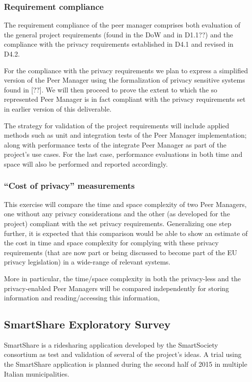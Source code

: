 \subsubsection{Requirement compliance}
The requirement compliance of the peer manager comprises both evaluation of the general project requirements (found in the DoW and in D1.1??) and the compliance with the privacy requirements established in D4.1 and revised in D4.2.

For the compliance with the privacy requirements we plan to express a simplified version of the Peer Manager using the formalization of privacy sensitive systems found in [??]. We will then proceed to prove the extent to which the so represented Peer Manager is in fact compliant with the privacy requirements set in earlier version of this deliverable. 

The strategy for validation of the project requirements will include applied methods such as unit and integration tests of the Peer Manager implementation; along with performance tests of the integrate Peer Manager as part of the project's use cases. For the last case, performance evaluations in both time and space will also be performed and reported accordingly.  

\subsubsection{``Cost of privacy'' measurements}
This exercise will compare the time and space complexity of two Peer Managers, one without any privacy considerations and the other (as developed for the project) compliant with the set privacy requirements. Generalizing one step further, it is expected that this comparison would be able to show an estimate of the cost in time and space complexity for complying with these privacy requirements (that are now part or being discussed to become part of the EU privacy legislation) in a wide-range of relevant systems.

More in particular, the time/space complexity in both the privacy-less and the privacy-enabled Peer Managers will be compared independently for storing information and reading/accessing this information, 

\subsection{SmartShare Exploratory Survey}
SmartShare is a ridesharing application developed by the SmartSociety consortium as test and validation of several of the project's ideas.  A trial using the SmartShare application is planned during the second half of 2015 in multiple Italian municipalities.  

